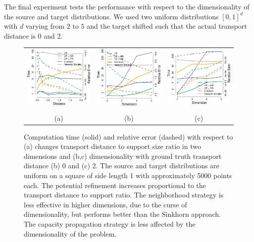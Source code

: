 \documentclass[twoside,11pt]{article}
\begin{document}
The final experiment tests the performance with respect to the dimensionality of
the source and target distributions. We used two uniform distributions $[0,1]^d$
with $d$ varying from $2$ to $5$ and the target shifted such that the actual
transport distance is 0 and 2.
\begin{figure}[htb]
\centering
\begin{tabular}{ccc}
\includegraphics[width=0.32\linewidth]{uniform-performance-distance} &
\includegraphics[width=0.32\linewidth]{uniform-d0-performance-dimensions} &
\includegraphics[width=0.32\linewidth]{uniform-d2-performance-dimensions} \\
                       \vspace{-0.2in} \\
                       (a) & (b)  & (c)
\end{tabular}
  \vspace{-0.1in}
\caption{
\label{fig:dimensions}
Computation time (solid) and relative error (dashed) with respect to (a)
changes transport distance to support size ratio in two dimensions and (b,c)
dimensionality with ground truth transport distance (b) 0 and (c) 2. The source
and target distributions are uniform on a square of side length 1 with
approximately 5000 points each. The potential refinement increases proportional
to the transport distance to support ratio. The neighborhood strategy is less
effective in higher dimensions, due to the curse of dimensionality, but
performs better than the Sinkhorn approach. The capacity propagation strategy
is less affected by the dimensionality of the problem. }  
\end{figure}
\end{document}
